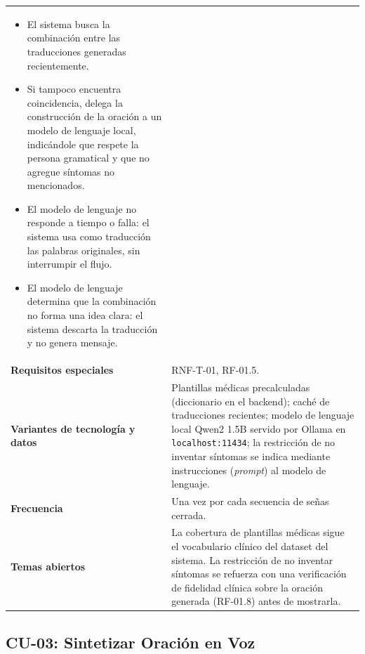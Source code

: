 \begin{longtable}{@{}>{\raggedright\arraybackslash}p{4.1cm} >{\raggedright\arraybackslash}p{\dimexpr\textwidth-4.1cm-2\tabcolsep\relax}@{}}
\begin{itemize}[leftmargin=*, itemsep=2pt]
    \begin{itemize}[leftmargin=*, itemsep=2pt]
        \item[3a1.] El sistema busca la combinación entre las traducciones
        generadas recientemente.
        \item[3a2.] Si tampoco encuentra coincidencia, delega la
        construcción de la oración a un modelo de lenguaje local,
        indicándole que respete la persona gramatical y que no agregue
        síntomas no mencionados.
        \item[3a2a.] El modelo de lenguaje no responde a tiempo o falla:
        el sistema usa como traducción las palabras originales, sin
        interrumpir el flujo.
        \item[3a2b.] El modelo de lenguaje determina que la combinación no
        forma una idea clara: el sistema descarta la traducción y no
        genera mensaje.
    \end{itemize}
\end{itemize} \\
\textbf{Requisitos especiales} & RNF-T-01, RF-01.5. \\
\textbf{Variantes de tecnología y datos} &
Plantillas médicas precalculadas (diccionario en el backend); caché de
traducciones recientes; modelo de lenguaje local Qwen2 1.5B servido por
Ollama en \texttt{localhost:11434}; la restricción de no inventar
síntomas se indica mediante instrucciones (\textit{prompt}) al modelo de
lenguaje. \\
\textbf{Frecuencia} & Una vez por cada secuencia de señas cerrada. \\
\textbf{Temas abiertos} &
La cobertura de plantillas médicas sigue el vocabulario clínico del
dataset del sistema. La restricción de no inventar síntomas se refuerza
con una verificación de fidelidad clínica sobre la oración generada
(RF-01.8) antes de mostrarla. \\
\bottomrule
\end{longtable}

\subsection{CU-03: Sintetizar Oración en Voz}

